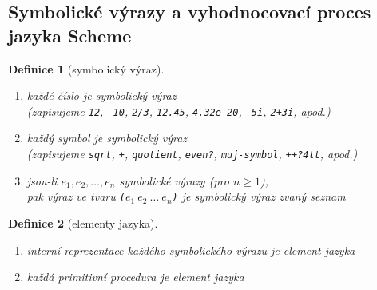 \documentclass[10pt,a4paper]{article}
\newtheorem{definition}{Definice}
\begin{document}
  \subsection{Symbolické výrazy a vyhodnocovací proces jazyka Scheme}
    \begin{definition}[symbolický výraz]\label{def-symbolicky-vyraz}\ 
      \begin{enumerate}
        \item každé \textit{číslo} je symbolický výraz\\ (zapisujeme \texttt{12}, \texttt{-10}, \texttt{2/3}, \texttt{12.45}, \texttt{4.32e-20}, \texttt{-5i}, \texttt{2+3i}, apod.)
        \item každý \textit{symbol} je symbolický výraz\\ (zapisujeme \texttt{sqrt}, \texttt{+}, \texttt{quotient}, \texttt{even?}, \texttt{muj-symbol}, \texttt{++?4tt}, apod.)
        \item jsou-li $e_{1}, e_{2}, \ldots, e_{n}$ symbolické výrazy (pro $n \geq 1$),\\ pak výraz ve tvaru \texttt{($e_1\ e_2\ \ldots\ e_n$)} je symbolický výraz zvaný \textit{seznam}
      \end{enumerate}
    \end{definition}
    \begin{definition}[elementy jazyka]\label{def-elementy-jazyka}\ 
      \begin{enumerate}
        \item interní reprezentace každého symbolického výrazu je element jazyka
        \item každá primitivní procedura je element jazyka
      \end{enumerate}
    \end{definition}
\end{document}
